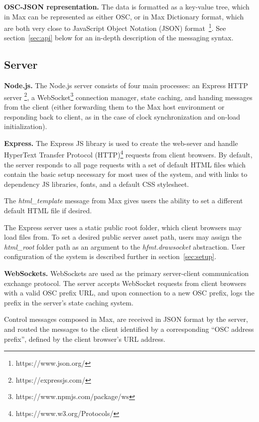 \medskip
\noindent
\textbf{OSC-JSON representation.}
The \drawsocket data is formatted as a key-value tree, which in Max can be represented as either OSC, or in Max Dictionary format, which are both very close to JavaScript Object Notation (JSON) format~\footnote{https://www.json.org/}. See section~\ref{sec:api} below for an in-depth description of the \drawsocket messaging syntax.

\subsection{Server}
\noindent
\textbf{Node.js.}
The Node.js server consists of four main processes: an Express HTTP server \footnote{https://expressjs.com/}, a WebSocket\footnote{https://www.npmjs.com/package/ws} connection manager, state caching, and handing messages from the client (either forwarding them to the Max host environment or responding back to client, as in the case of clock synchronization and on-load initialization).

\medskip
\noindent
\textbf{Express.}
The Express JS library is used to create the web-sever and handle HyperText Transfer Protocol (HTTP)\footnote{https://www.w3.org/Protocols/} requests from client browsers. By default, the server responds to all page requests with a set of default HTML files which contain the basic setup necessary for most uses of the \drawsocket system, and with links to dependency JS libraries, fonts, and a default CSS stylesheet.

The \textit{html\_template} message from Max gives users the ability to set a different default HTML file if desired.

The Express server uses a static public root folder, which client browsers may load files from. To set a desired public server asset path, users may assign the \textit{html\_root} folder path as an argument to the \textit{hfmt.drawsocket} abstraction. 
User configuration of the system is described further in section~\ref{sec:setup}.

\medskip
\noindent
\textbf{WebSockets.}
WebSockets are used as the primary server-client communication exchange protocol.
The server accepts WebSocket requests from client browsers with a valid OSC prefix URL, and upon connection to a new OSC prefix, logs the prefix in the server's state caching system.

Control messages composed in Max, are received in JSON format by the server, and routed the messages to the client identified by a corresponding ``OSC address prefix'', defined by the client browser's URL address.

